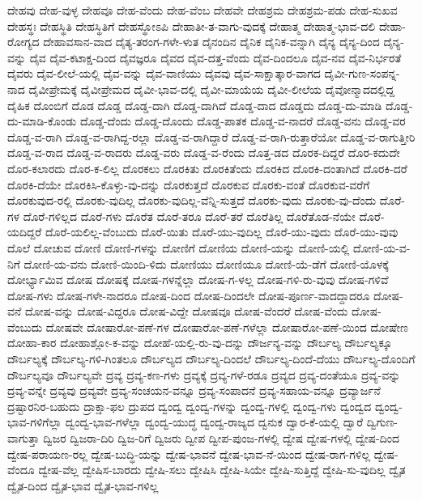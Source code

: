 {ದೇಹವು
ದೇಹ-ವುಳ್ಳ
ದೇಹವೂ
ದೇಹ-ವೆಂದು
ದೇಹ-ವೆಂಬ
ದೇಹವೇ
ದೇಹಶ್ರಮ
ದೇಹಶ್ರಮ-ಪಡು
ದೇಹ-ಸುಖವ
ದೇಹಸ್ಥಃ
ದೇಹಸ್ಥಿತಿ
ದೇಹಸ್ಥಿತಿಗೆ
ದೇಹಸ್ಥೋಽಪಿ
ದೇಹಾತೀ-ತ-ವಾಗು-ವುದಕ್ಕೆ
ದೇಹಾತ್ಮ
ದೇಹಾತ್ಮ-ಭಾವ-ದಲಿ
ದೇಹಾ-ರೋಗ್ಯದ
ದೇಹಾವಸಾನ-ವಾದ
ದೈತ್ಯ-ತರಂಗ-ಗಳೇ-ಳುತ
ದೈನಂದಿನ
ದೈನಿಕ
ದೈನಿಕ-ವನ್ನಾಗಿ
ದೈನ್ಯ
ದೈನ್ಯ-ದಿಂದ
ದೈನ್ಯ-ವನ್ನು
ದೈವ
ದೈವ-ಕಟಾಕ್ಷ-ದಿಂದ
ದೈವಜ್ಞರೂ
ದೈವದ
ದೈವ-ದತ್ತ-ವೆಂದು
ದೈವ-ದಿಂದಲೂ
ದೈವ-ನವ
ದೈವ-ನಿರ್ಭರತೆ
ದೈವರು
ದೈವ-ಲೀಲೆ-ಯಲ್ಲಿ
ದೈವ-ವನ್ನು
ದೈವ-ವಾಣಿಯು
ದೈವವು
ದೈವ-ಸಾಕ್ಷಾತ್ಕಾರ-ವಾಗದ
ದೈವೀ-ಗುಣ-ಸಂಪನ್ನ-ನಾದ
ದೈವೀಪ್ರೇಮಕ್ಕೆ
ದೈವೀಪ್ರೇಮದ
ದೈವೀ-ಭಾವ-ದಲ್ಲಿ
ದೈವೀ-ಮಾಯೆಯ
ದೈವೀ-ಲೀಲೆಯ
ದೈವೋನ್ಮಾದದಲ್ಲಿದ್ದ
ದೈಹಿಕ
ದೊಂಬಿಗೆ
ದೊಡ
ದೊಡ್ಡ
ದೊಡ್ಡ-ದಾಗಿ
ದೊಡ್ಡ-ದಾಗಿದೆ
ದೊಡ್ಡ-ದಾದ
ದೊಡ್ಡದು
ದೊಡ್ಡ-ದು-ಮಾಡಿ
ದೊಡ್ಡ-ದು-ಮಾಡಿ-ಕೊಂಡು
ದೊಡ್ಡ-ದೆಂದು
ದೊಡ್ಡ-ದೊಂದು
ದೊಡ್ಡ-ಪಾತಕ
ದೊಡ್ಡ-ವ-ನಾದರೆ
ದೊಡ್ಡ-ವನು
ದೊಡ್ಡ-ವರ
ದೊಡ್ಡ-ವ-ರಾಗಿ
ದೊಡ್ಡ-ವ-ರಾಗಿದ್ದ-ರಲ್ಲಾ
ದೊಡ್ಡ-ವ-ರಾಗಿದ್ದಾರೆ
ದೊಡ್ಡ-ವ-ರಾಗಿ-ರುತ್ತಾರೆಯೋ
ದೊಡ್ಡ-ವ-ರಾಗುತ್ತೀರಿ
ದೊಡ್ಡ-ವ-ರಾದ
ದೊಡ್ಡ-ವ-ರಾದರು
ದೊಡ್ಡ-ವರು
ದೊಡ್ಡ-ವ-ರೆಂದು
ದೊತ್ತ-ಡದ
ದೊರಕ-ದಿದ್ದರೆ
ದೊರ-ಕದುದೇ
ದೊರ-ಕಲಾರದು
ದೊರ-ಕ-ಲಿಲ್ಲ
ದೊರಕಲು
ದೊರಕಿತು
ದೊರಕಿತೆಂದು
ದೊರಕಿದ
ದೊರಕಿ-ದಂತಾಗಿದೆ
ದೊರಕಿ-ದರೆ
ದೊರಕಿ-ದೆಯೇ
ದೊರಕಿಸಿ-ಕೊಳ್ಳು-ವು-ದನ್ನು
ದೊರಕುತ್ತದೆ
ದೊರಕುವ
ದೊರಕು-ವಂತೆ
ದೊರಕುವ-ವರೆಗೆ
ದೊರಕುವುದ-ರಲ್ಲಿ
ದೊರಕು-ವುದಿಲ್ಲ
ದೊರಕು-ವುದಿಲ್ಲ-ವೆನ್ನಿ-ಸುತ್ತದೆ
ದೊರಕು-ವುದು
ದೊರಕು-ವು-ದೆಂದು
ದೊರೆ-ಗಳ
ದೊರೆ-ಗಳಿಲ್ಲದ
ದೊರೆ-ಗಳು
ದೊರೆತ
ದೊರೆ-ತರೂ
ದೊರೆ-ತರೆ
ದೊರೆತಿಲ್ಲ
ದೊರೆತೊಡ-ನೆಯೇ
ದೊರೆ-ಯದಿದ್ದರೆ
ದೊರೆ-ಯಲಿಲ್ಲ-ವೆಂಬುದು
ದೊರೆ-ಯಿತು
ದೊರೆ-ಯು-ವುದಿಲ್ಲ
ದೊರೆ-ಯು-ವುದು
ದೊರೆ-ಯು-ವುವು
ದೊಲೆ
ದೋಚುವ
ದೋಣಿ
ದೋಣಿ-ಗಳನ್ನು
ದೋಣಿಗೆ
ದೋಣಿಯ
ದೋಣಿ-ಯನ್ನು
ದೋಣಿ-ಯಲ್ಲಿ
ದೋಣಿ-ಯ-ವ-ನಿಗೆ
ದೋಣಿ-ಯ-ವನು
ದೋಣಿ-ಯಿಂದಿ-ಳಿದು
ದೋಣಿಯು
ದೋಣಿಯೂ
ದೋಣಿ-ಯೆ-ಡೆಗೆ
ದೋಣಿ-ಯೊಳಕ್ಕೆ
ದೋರ್ಭ್ಯಾಮಿವ
ದೋಷ
ದೋಷಕ್ಕೆ
ದೋಷ-ಗಳನ್ನೆಲ್ಲಾ
ದೋಷ-ಗ-ಳಲ್ಲ
ದೋಷ-ಗಳಿ-ರು-ವುವು
ದೋಷ-ಗಳಿವೆ
ದೋಷ-ಗಳು
ದೋಷ-ಗಳೇ-ನಾದರೂ
ದೋಷ-ದಿಂದ
ದೋಷ-ದಿಂದಲೇ
ದೋಷ-ಪೂರ್ಣ-ವಾದದ್ದಾದರೂ
ದೋಷ-ವನೆ
ದೋಷ-ವನ್ನು
ದೋಷ-ವಿದ್ದರೂ
ದೋಷ-ವಿದ್ದೇ
ದೋಷವೂ
ದೋಷ-ವೆಂದರೆ
ದೋಷ-ವೆಂದು
ದೋಷ-ವೆಂಬುದು
ದೋಷವೇ
ದೋಷಾರೋ-ಪಣೆ-ಗಳ
ದೋಷಾರೋ-ಪಣೆ-ಗಳೆಲ್ಲಾ
ದೋಷಾರೋ-ಪಣೆ-ಯಿಂದ
ದೋಷೇಣ
ದೋಹಾ-ಕಾರ
ದೋಹಾಶ್ಲೋ-ಕ-ವನ್ನು
ದೋಹೆ-ಯಲ್ಲಿ-ರು-ವು-ದನ್ನು
ದೌರ್ಜನ್ಯ-ವನ್ನು
ದೌರ್ಬಲ್ಯ
ದೌರ್ಬಲ್ಯಕ್ಕೂ
ದೌರ್ಬಲ್ಯಕ್ಕೆ
ದೌರ್ಬಲ್ಯ-ಗಳಿ-ಗಿಂತಲೂ
ದೌರ್ಬಲ್ಯದ
ದೌರ್ಬಲ್ಯ-ದಿಂದಲೆ
ದೌರ್ಬಲ್ಯ-ದಿಂದೆ-ದೆಯು
ದೌರ್ಬಲ್ಯ-ದೊಂದಿಗೆ
ದೌರ್ಬಲ್ಯವೂ
ದೌರ್ಬಲ್ಯವೇ
ದ್ರವ್ಯ
ದ್ರವ್ಯ-ಕಣ-ಗಳು
ದ್ರವ್ಯಕ್ಕೆ
ದ್ರವ್ಯ-ಗಳೆ-ರಡೂ
ದ್ರವ್ಯದ
ದ್ರವ್ಯ-ದಂತೆಯೂ
ದ್ರವ್ಯ-ವನ್ನು
ದ್ರವ್ಯ-ವನ್ನೇ
ದ್ರವ್ಯವು
ದ್ರವ್ಯವೇ
ದ್ರವ್ಯ-ಸಂಚಯನ-ವನ್ನೂ
ದ್ರವ್ಯ-ಸಂಪಾದನೆ
ದ್ರವ್ಯ-ಸಹಾಯ-ವನ್ನೂ
ದ್ರವ್ಯಾರ್ಜನೆ
ದ್ರಷ್ಟಾರನಿರ-ಬಹುದು
ದ್ರಾಕ್ಷಾ-ಫಲ
ದ್ರುಪದ
ದ್ವಂದ್ವ
ದ್ವಂದ್ವ-ಗಳನ್ನು
ದ್ವಂದ್ವ-ಗಳಲ್ಲಿ
ದ್ವಂದ್ವ-ಗಳು
ದ್ವಂದ್ವದ
ದ್ವಂದ್ವ-ಭಾವ-ಗಳಿಗೆಲ್ಲಾ
ದ್ವಂದ್ವ-ಭಾವ-ಗಳೆಲ್ಲಾ
ದ್ವಂದ್ವ-ಯುದ್ಧ
ದ್ವಂದ್ವ-ರಾಜ್ಯದ
ದ್ವನುಕ
ದ್ವಾರ-ಕೆ-ಯಲ್ಲಿ
ದ್ವಾರೆ
ದ್ವಿಗುಣ-ವಾಗುತ್ತಾ
ದ್ವಿಜರ
ದ್ವಿಜರಾ-ದಿರಿ
ದ್ವಿಜ-ರಿಗೆ
ದ್ವಿಜರು
ದ್ವೀಪ
ದ್ವೀಪ-ಪುಂಜ-ಗಳಲ್ಲಿ
ದ್ವೇಷ
ದ್ವೇಷ-ಗಳಲ್ಲಿ
ದ್ವೇಷ-ದಿಂದ
ದ್ವೇಷ-ಪರಾಯಣ-ರಲ್ಲ
ದ್ವೇಷ-ಬುದ್ಧಿ-ಯನ್ನು
ದ್ವೇಷ-ಭಾವನೆ
ದ್ವೇಷ-ಭಾವ-ನೆ-ಯಿಂದ
ದ್ವೇಷ-ರಾಗ-ಗಳಿಲ್ಲ
ದ್ವೇಷ-ವೆಂದೂ
ದ್ವೇಷ-ವೆಲ್ಲ
ದ್ವೇಷಿಸ-ಬಾರದು
ದ್ವೇಷಿ-ಸಲು
ದ್ವೇಷಿಸಿ
ದ್ವೇಷಿ-ಸಿಯೇ
ದ್ವೇಷಿ-ಸುತ್ತಿದ್ದೆ
ದ್ವೇಷಿ-ಸು-ವುದಿಲ್ಲ
ದ್ವೈತ
ದ್ವೈತ-ದಿಂದ
ದ್ವೈತ-ಭಾವ
ದ್ವೈತ-ಭಾವ-ಗಳಿಲ್ಲ
}
